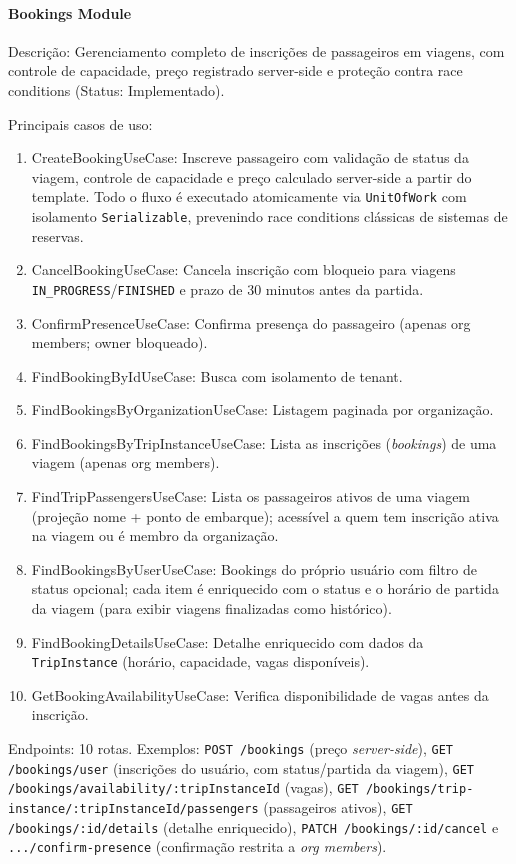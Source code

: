 \paragraph{Bookings Module}

Descrição: Gerenciamento completo de inscrições de passageiros em viagens, com controle de capacidade, preço registrado server-side e proteção contra race conditions (Status: Implementado).

Principais casos de uso:
\begin{enumerate}
\item CreateBookingUseCase: Inscreve passageiro com validação de status da viagem, controle de capacidade e preço calculado server-side a partir do template. Todo o fluxo é executado atomicamente via \texttt{UnitOfWork} com isolamento \texttt{Serializable}, prevenindo race conditions clássicas de sistemas de reservas.
\item CancelBookingUseCase: Cancela inscrição com bloqueio para viagens \texttt{IN\_PROGRESS}/\texttt{FINISHED} e prazo de 30 minutos antes da partida.
\item ConfirmPresenceUseCase: Confirma presença do passageiro (apenas org members; owner bloqueado).
\item FindBookingByIdUseCase: Busca com isolamento de tenant.
\item FindBookingsByOrganizationUseCase: Listagem paginada por organização.
\item FindBookingsByTripInstanceUseCase: Lista as inscrições (\textit{bookings}) de uma viagem (apenas org members).
\item FindTripPassengersUseCase: Lista os passageiros ativos de uma viagem (projeção nome + ponto de embarque); acessível a quem tem inscrição ativa na viagem ou é membro da organização.
\item FindBookingsByUserUseCase: Bookings do próprio usuário com filtro de status opcional; cada item é enriquecido com o status e o horário de partida da viagem (para exibir viagens finalizadas como histórico).
\item FindBookingDetailsUseCase: Detalhe enriquecido com dados da \texttt{TripInstance} (horário, capacidade, vagas disponíveis).
\item GetBookingAvailabilityUseCase: Verifica disponibilidade de vagas antes da inscrição.
\end{enumerate}

Endpoints: 10 rotas. Exemplos: \texttt{POST /bookings} (preço \textit{server-side}), \texttt{GET /bookings/user} (inscrições do usuário, com status/partida da viagem), \texttt{GET /bookings/availability/:tripInstanceId} (vagas), \texttt{GET /bookings/trip-instance/:tripInstanceId/passengers} (passageiros ativos), \texttt{GET /bookings/:id/details} (detalhe enriquecido), \texttt{PATCH /bookings/:id/cancel} e \texttt{.../confirm-presence} (confirmação restrita a \textit{org members}).

